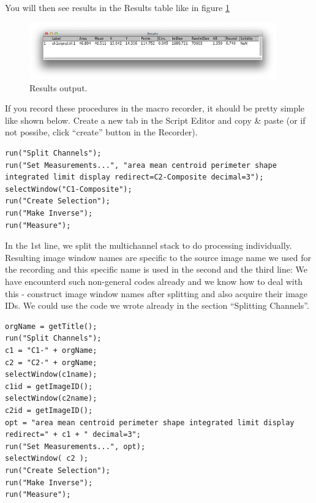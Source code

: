 \documentclass[11pt,a4paper,oneside]{report}
\begin{document}
You will then see results in the Results table like in figure \ref{fig_NucRimMeasureResults}

\begin{figure}[h!]
\begin{center}
\includegraphics[width=0.95\textwidth]{fig/MeasurementResults.png}
\caption{Results output.}
\label{fig_NucRimMeasureResults}
\end{center}
\end{figure}

If you record these procedures in the macro recorder, it should be pretty simple like shown below. Create a new tab in the Script Editor and copy \& paste (or if not possibe, click ``create'' button in the Recorder).

\begin{lstlisting}
run("Split Channels");
run("Set Measurements...", "area mean centroid perimeter shape integrated limit display redirect=C2-Composite decimal=3");
selectWindow("C1-Composite");
run("Create Selection");
run("Make Inverse");
run("Measure");
\end{lstlisting}

In the 1st line, we split the multichannel stack to do processing individually. Resulting image window names are specific to the source image name we used for the recording and this specific name is used in the second and the third line:  We have encounterd such non-general codes already and we know how to deal with this - construct image window names after splitting and also acquire their image IDs. We could use the code we wrote already in the section ``Splitting Channels''. 

\begin{lstlisting}[morekeywords={*, c1, c2, opt, getTitle}]
orgName = getTitle();
run("Split Channels");
c1 = "C1-" + orgName;
c2 = "C2-" + orgName;
selectWindow(c1name);
c1id = getImageID();
selectWindow(c2name);
c2id = getImageID();
opt = "area mean centroid perimeter shape integrated limit display redirect=" + c1 + " decimal=3";
run("Set Measurements...", opt);
selectWindow( c2 );
run("Create Selection");
run("Make Inverse");
run("Measure");
\end{lstlisting}
\end{document}

